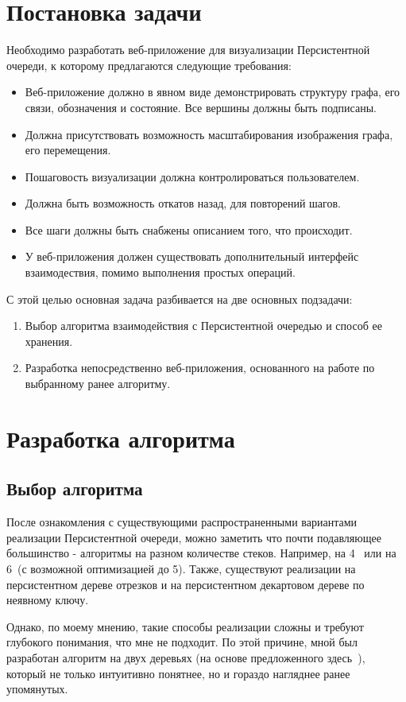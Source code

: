 \documentclass[a4paper,12pt]{extarticle}
\begin{document}
\section{Постановка задачи}
Необходимо разработать веб-приложение для визуализации Персистентной очереди, к которому предлагаются следующие требования:
\begin{itemize}
    \item Веб-приложение должно в явном виде демонстрировать структуру графа, его связи, обозначения и состояние. Все вершины должны быть подписаны.
    \item Должна присутствовать возможность масштабирования изображения графа, его перемещения.
    \item Пошаговость визуализации должна контролироваться пользователем.
    \item Должна быть возможность откатов назад, для повторений шагов.
    \item Все шаги должны быть снабжены описанием того, что происходит.
    \item У веб-приложения должен существовать дополнительный интерфейс взаимодествия, помимо выполнения простых операций.
\end{itemize}
С этой целью основная задача разбивается на две основных подзадачи:
\begin{enumerate}
    \item Выбор алгоритма взаимодействия с Персистентной очередью и способ ее хранения.
    \item Разработка непосредственно веб-приложения, основанного на работе по выбранному ранее алгоритму.
\end{enumerate}

\section{Разработка алгоритма}
\subsection{Выбор алгоритма}
После ознакомления с существующими распространенными вариантами реализации Персистентной очереди, можно заметить что почти подавляющее большинство - алгоритмы на разном количестве стеков. Например, на 4~\cite{codeforces} или на 6~\cite{neerc-ifmo}(с возможной оптимизацией до 5). Также, существуют реализации на персистентном дереве отрезков и на персистентном декартовом дереве по неявному ключу.\par
Однако, по моему мнению, такие способы реализации сложны и требуют глубокого понимания, что мне не подходит. По этой причине, мной был разработан алгоритм на двух деревьях (на основе предложенного здесь~\cite{habr}), который не только интуитивно понятнее, но и гораздо нагляднее ранее упомянутых.
\end{document}
